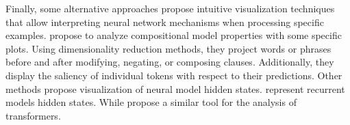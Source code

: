 Finally, some alternative approaches propose intuitive visualization techniques that allow interpreting neural network mechanisms when processing specific examples. \textcite{li_16} propose to analyze compositional model properties with some specific plots. Using dimensionality reduction methods, they project words or phrases before and after modifying, negating, or composing clauses. Additionally, they display the saliency of individual tokens with respect to their predictions. Other methods propose visualization of neural model hidden states. \textcite{strobelt_18} represent recurrent models hidden states. While \textcite{hoover_19} propose a similar tool for the analysis of transformers.
